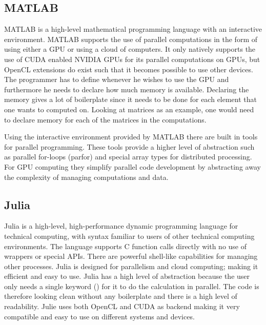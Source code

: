 \subsection{MATLAB}
MATLAB is a high-level mathematical programming language with an interactive environment.
MATLAB supports the use of parallel computations in the form of using either a GPU or using a cloud of computers.
It only natively supports the use of CUDA enabled NVIDIA GPUs for its parallel computations on GPUs, but OpenCL extensions do exist such that it becomes possible to use other devices.
The programmer has to define whenever he wishes to use the GPU and furthermore he needs to declare how much memory is available.
Declaring the memory gives a lot of boilerplate since it needs to be done for each element that one wants to computed on.
Looking at matrices as an example, one would need to declare memory for each of the matrices in the computations.\citep{MATLAB_backend,MATLAB_benchmark,}

Using the interactive environment provided by MATLAB there are built in tools for parallel programming.
These tools provide a higher level of abstraction such as parallel for-loops (parfor) and special array types for distributed processing.
For GPU computing they simplify parallel code development by abstracting away the complexity of managing computations and data.\citep{MATLAB_parallel}

\subsection{Julia}
Julia is a high-level, high-performance dynamic programming language for technical computing, with syntax familiar to users of other technical computing environments.
The language supports C function calls directly with no use of wrappers or special APIs.
There are powerful shell-like capabilities for managing other processes.
Julia is designed for parallelism and cloud computing; making it efficient and easy to use.
Julia has a high level of abstraction because the user only needs a single keyword (\@parallel) for it to do the calculation in parallel.
The code is therefore looking clean without any boilerplate and there is a high level of readability.
Julie uses both OpenCL and CUDA as backend making it very compatible and easy to use on different systems and devices.\citep{Julia_Git,Julia}

